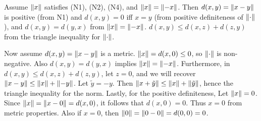 \begin{solution}
	Assume $ \norm{x} $ satisfies (N1), (N2), (N4), and $ \norm{x} = \norm{-x} $. Then $ d(x,y) = \norm{x-y} $ is positive (from N1) and $ d(x,y) = 0 $ iff $ x=y $ (from positive definiteness of $ \norm{\cdot} $), and $ d(x,y) = d(y,x) $ from $ \norm{x} = \norm{-x} $. $ d(x,y) \leq d(x,z) + d(z,y)  $ from the triangle inequality for $ \norm{\cdot} $. 
	
	Now assume $ d(x,y)  = \norm{x-y} $ is a metric. $ \norm{x} = d(x,0) \leq 0 $, so $ \norm{\cdot}$ is non-negative. Also $ d(x,y) = d(y,x) $ implies $ \norm{x} = \norm{-x} $. Furthermore, in $ d(x,y) \leq d(x,z) + d(z,y) $, let $ z=0 $, and we will recover $ \norm{x-y} \leq \norm{x} + \norm{-y} $. Let $ \tilde{y} = -y $. Then $ \norm{x+\tilde{y}} \leq \norm{x} + \norm{\tilde{y}} $, hence the triangle inequality for the norm. Lastly, for the positive definiteness, Let $ \norm{x} = 0 $. Since $ \norm{x} = \norm{x-0} = d(x,0) $, it follows that $ d(x,0) = 0 $. Thus $ x=0 $ from metric properties. Also if $ x=0 $, then $ \norm{0} = \norm{0-0} = d(0,0) = 0 $.
\end{solution}
